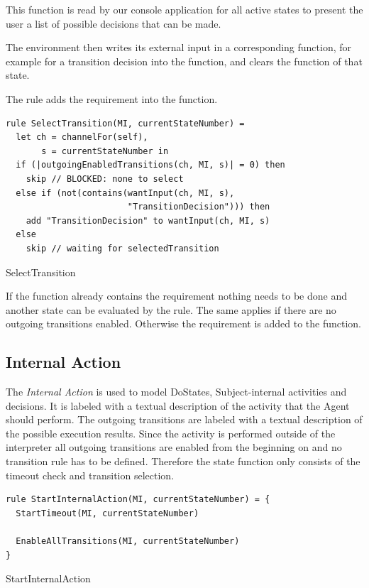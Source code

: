 This function is read by our console application for all active states
to present the user a list of possible decisions that can be made.

The environment then writes its external input in a corresponding function, for
example for a transition decision into the  function, and
clears the  function of that state.

The  rule adds the 
requirement into the  function.


\begin{listing}[htbp]
\begin{verbatim}
rule SelectTransition(MI, currentStateNumber) =
  let ch = channelFor(self),
       s = currentStateNumber in
  if (|outgoingEnabledTransitions(ch, MI, s)| = 0) then
    skip // BLOCKED: none to select
  else if (not(contains(wantInput(ch, MI, s),
                        "TransitionDecision"))) then
    add "TransitionDecision" to wantInput(ch, MI, s)
  else
    skip // waiting for selectedTransition
\end{verbatim}
\caption{SelectTransition}
\label{lst:shortasm:SelectTransition}
\end{listing}


If the  function already contains the
 requirement nothing needs to be done and another
state can be evaluated by the  rule.
The same applies if there are no outgoing transitions enabled.
Otherwise the requirement is added to the  function.


\subsection{Internal Action}


The \emph{Internal Action} is used to model DoStates, Subject-internal activities and decisions.
It is labeled with a textual description of the activity that the Agent should perform.
The outgoing transitions are labeled with a textual description of the possible execution results.
Since the activity is performed outside of the interpreter all outgoing transitions are enabled from the beginning on and no transition rule has to be defined.
Therefore the state function only consists of the timeout check and transition selection.


\begin{listing}[htbp]
\begin{verbatim}
rule StartInternalAction(MI, currentStateNumber) = {
  StartTimeout(MI, currentStateNumber)

  EnableAllTransitions(MI, currentStateNumber)
}
\end{verbatim}
\caption{StartInternalAction}
\label{lst:shortasm:StartInternalAction}
\end{listing}



